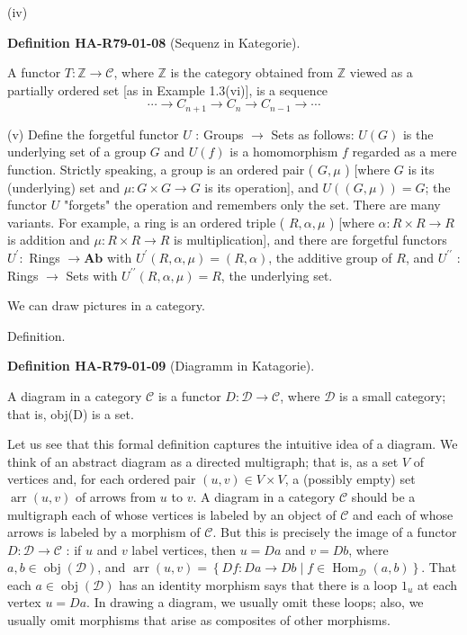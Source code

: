 \documentclass[10pt, letterpaper]{article}
\newcommand{\CustomHeading}[3]{%
  \par\medskip\noindent%
  \textbf{#1 #2} \textnormal{(#3)}.\enskip%
}
\newenvironment{DEF}[2]{\begin{unitbox}\CustomHeading{Definition}{#1}{#2}}{\end{unitbox}}
\begin{document}
(iv) 


\begin{DEF}{HA-R79-01-08}{Sequenz in Kategorie}
A functor $T: \mathbb{Z} \rightarrow \mathcal{C}$, where $\mathbb{Z}$ is the category obtained from $\mathbb{Z}$ viewed as a partially ordered set [as in Example 1.3(vi)], is a sequence
$$
\cdots \rightarrow C_{n+1} \rightarrow C_{n} \rightarrow C_{n-1} \rightarrow \cdots
$$
\end{DEF}


(v) Define the forgetful functor $U$ : Groups $\rightarrow$ Sets as follows: $U(G)$ is the underlying set of a group $G$ and $U(f)$ is a homomorphism $f$ regarded as a mere function. Strictly speaking, a group is an ordered pair ( $G, \mu$ ) [where $G$ is its (underlying) set and $\mu: G \times G \rightarrow G$ is its operation], and $U((G, \mu))=G$; the functor $U$ "forgets" the operation and remembers only the set. There are many variants. For example, a ring is an ordered triple ( $R, \alpha, \mu$ ) [where $\alpha: R \times R \rightarrow R$ is addition and $\mu: R \times R \rightarrow R$ is multiplication], and there are forgetful functors $U^{\prime}:$ Rings $\rightarrow \mathbf{A b}$ with $U^{\prime}(R, \alpha, \mu)=(R, \alpha)$, the additive group of $R$, and $U^{\prime \prime}$ : Rings $\rightarrow$ Sets with $U^{\prime \prime}(R, \alpha, \mu)=R$, the underlying set.



We can draw pictures in a category.

Definition. 


\begin{DEF}{HA-R79-01-09}{Diagramm in Katagorie}
A diagram in a category $\mathcal{C}$ is a functor $D: \mathcal{D} \rightarrow \mathcal{C}$, where $\mathcal{D}$ is a small category; that is, obj(D) is a set.
\end{DEF}

Let us see that this formal definition captures the intuitive idea of a diagram. We think of an abstract diagram as a directed multigraph; that is, as a set $V$ of vertices and, for each ordered pair $(u, v) \in V \times V$, a (possibly empty) set $\operatorname{arr}(u, v)$ of arrows from $u$ to $v$. A diagram in a category $\mathcal{C}$ should be a multigraph each of whose vertices is labeled by an object of $\mathcal{C}$ and each of whose arrows is labeled by a morphism of $\mathcal{C}$. But this is precisely the image of a functor $D: \mathcal{D} \rightarrow \mathcal{C}$ : if $u$ and $v$ label vertices, then $u=D a$ and $v=D b$, where $a, b \in \operatorname{obj}(\mathcal{D})$, and $\operatorname{arr}(u, v)=\left\{D f: D a \rightarrow D b \mid f \in \operatorname{Hom}_{\mathcal{D}}(a, b)\right\}$. That each $a \in \operatorname{obj}(\mathcal{D})$ has an identity morphism says that there is a loop $1_{u}$ at each vertex $u=D a$. In drawing a diagram, we usually omit these loops; also, we usually omit morphisms that arise as composites of other morphisms.
\end{document}
